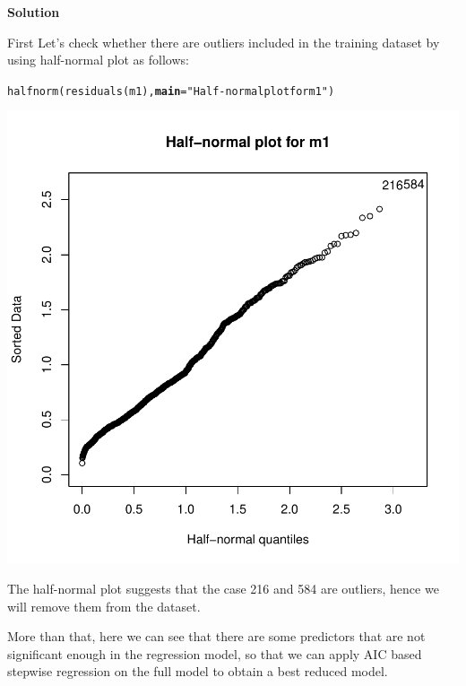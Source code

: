 \documentclass[12pt,oneside,a4paper]{article}\usepackage[]{graphicx}\usepackage[]{xcolor}
\makeatletter
\newcommand{\hlstr}[1]{\textcolor[rgb]{0,0,1}{#1}}%
\newcommand{\hlstd}[1]{\textcolor[rgb]{0,0,0}{#1}}%
\newcommand{\hlkwc}[1]{\textcolor[rgb]{0.498,0,0.333}{\textbf{#1}}}%
\newcommand{\hlkwd}[1]{\textcolor[rgb]{0,0,0}{#1}}%
\newenvironment{kframe}{%
 \def\at@end@of@kframe{}%
 \ifinner\ifhmode%
  \def\at@end@of@kframe{\end{minipage}}%
  \begin{minipage}{\columnwidth}%
 \fi\fi%
 \def\FrameCommand##1{\hskip\@totalleftmargin \hskip-\fboxsep
 \colorbox{shadecolor}{##1}\hskip-\fboxsep
     \hskip-\linewidth \hskip-\@totalleftmargin \hskip\columnwidth}%
 \MakeFramed {\advance\hsize-\width
   \@totalleftmargin\z@ \linewidth\hsize
   \@setminipage}}%
 {\par\unskip\endMakeFramed%
 \at@end@of@kframe}
\newenvironment{knitrout}{}{} %
\newcommand{\solution}
{
    \vspace{15pt}
    \noindent\ignorespaces\textbf{\large Solution}\par
}
\makeatother
\begin{document}
\solution
First Let's check whether there are outliers included in the training dataset by using half-normal plot as follows:
\begin{knitrout}
\color{fgcolor}\begin{kframe}
\begin{alltt}
\hlkwd{halfnorm}\hlstd{(}\hlkwd{residuals}\hlstd{(m1),} \hlkwc{main} \hlstd{=} \hlstr{"Half-normal plot for m1"}\hlstd{)}
\end{alltt}
\end{kframe}

{\centering \includegraphics[width=.7\linewidth]{figure/p3_ep-1} 

}



\end{knitrout}

The half-normal plot suggests that the case 216 and 584 are outliers, hence we will remove them from the dataset.

More than that, here we can see that there are some predictors that are not significant enough in the regression model, so that we can apply AIC based stepwise regression on the full model to obtain a best reduced model.
\end{document}
